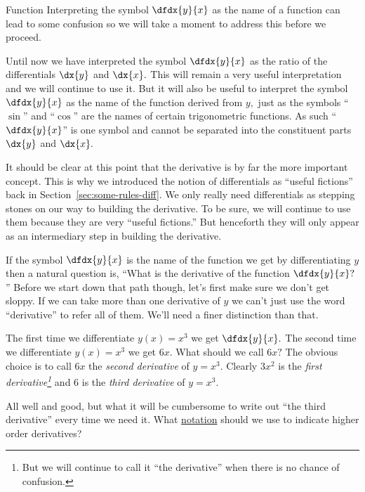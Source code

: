 \begin{mynotation}{Function}
  Interpreting the symbol $\dfdx{y}{x}$ as the name of a function can
  lead to some confusion so we will take a moment to address this
  before we proceed.

  Until now we have interpreted the symbol $\dfdx{y}{x}$ as the ratio
  of the differentials $\dx{y}$ and $\dx{x}.$ This will remain a very
  useful interpretation and we will continue to use it. But it will
  also be useful to interpret the symbol $\dfdx{y}{x}$ as the name of
  the function derived from $y,$ just as the symbols ``$\sin$'' and
  ``$\cos$'' are the names of certain trigonometric functions. As such
  ``$\dfdx{y}{x}$'' is \alert{one symbol} and cannot be separated into
  the constituent parts $\dx{y}$ and $\dx{x}.$

  It should be clear at this point that the derivative is by far the
  more important concept. This is why we introduced the notion of
  differentials as ``useful fictions'' back in
  Section~\ref{sec:some-rules-diff}. We only really need differentials
  as stepping stones on our way to building the derivative. To be
  sure, we will continue to use them because they are very ``useful
  fictions.'' But henceforth they will only appear as an intermediary
  step in building the derivative.
\end{mynotation}

If the symbol $\dfdx{y}{x}$ is the name of the function we get by
differentiating $y$ then a natural question is, ``What is the
derivative of the function $\dfdx{y}{x}?$'' Before we start down that
path though, let's first make sure we don't get sloppy. If we can take
more than one derivative of $y$ we can't just use the word
``derivative'' to refer all of them. We'll need a finer distinction
than that.


The first time  we differentiate $y(x) = x^3$  we get $\dfdx{y}{x}.$
The second time we differentiate $y(x) = x^3$ we
 get $6x.$ What should we call
$6x?$ The obvious
choice is to call $6x$ the \emph{second derivative} of $y=x^3.$
Clearly $3x^2$  is the \emph{first derivative\footnote{But we will
    continue to call it ``the derivative'' when there is no chance of
    confusion.}} and $6$ is the
\emph{third derivative} of $y=x^3.$

All well and good, but what it will be cumbersome to write out ``the
third derivative'' every time we need it. What \underline{notation}
should we use to indicate higher order derivatives?


